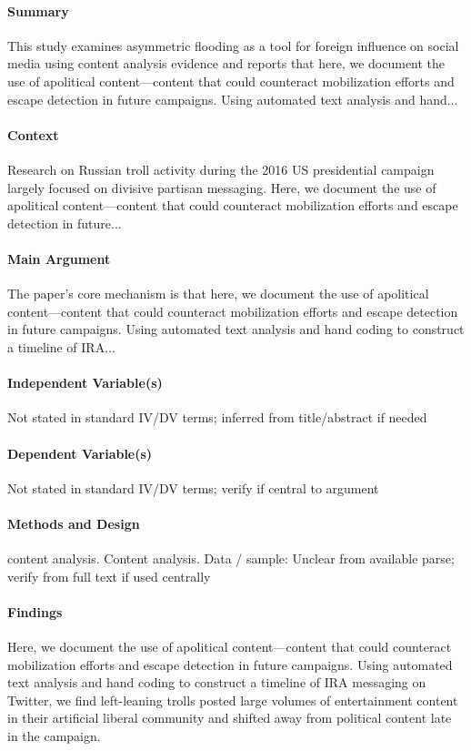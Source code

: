 \documentclass[12pt]{article}
\begin{document}
\paragraph{Summary} This study examines asymmetric flooding as a tool for foreign influence on social media using content analysis evidence and reports that here, we document the use of apolitical content---content that could counteract mobilization efforts and escape detection in future campaigns. Using automated text analysis and hand...

\paragraph{Context} Research on Russian troll activity during the 2016 US presidential campaign largely focused on divisive partisan messaging. Here, we document the use of apolitical content---content that could counteract mobilization efforts and escape detection in future...

\paragraph{Main Argument} The paper's core mechanism is that here, we document the use of apolitical content---content that could counteract mobilization efforts and escape detection in future campaigns. Using automated text analysis and hand coding to construct a timeline of IRA...

\paragraph{Independent Variable(s)} Not stated in standard IV/DV terms; inferred from title/abstract if needed

\paragraph{Dependent Variable(s)} Not stated in standard IV/DV terms; verify if central to argument

\paragraph{Methods and Design} content analysis. Content analysis. Data / sample: Unclear from available parse; verify from full text if used centrally

\paragraph{Findings} Here, we document the use of apolitical content---content that could counteract mobilization efforts and escape detection in future campaigns. Using automated text analysis and hand coding to construct a timeline of IRA messaging on Twitter, we find left-leaning trolls posted large volumes of entertainment content in their artificial liberal community and shifted away from political content late in the campaign.
\end{document}
